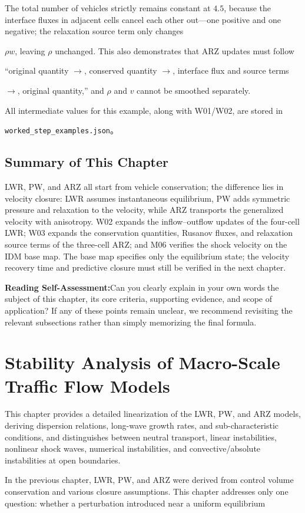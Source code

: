 \documentclass[11pt,a4paper,openany]{book}
\numberwithin{equation}{chapter}
\numberwithin{figure}{chapter}
\numberwithin{table}{chapter}
\newcommand{\sectionwrapup}[1]{%
  \section{Summary of This Chapter}
  \begin{tcolorbox}[summarybox,title=\textbf{Chapter Review}]
  #1
  \par\smallskip
  \textbf{Reading Self-Assessment:}Can you clearly explain in your own words the subject of this chapter, its core criteria, supporting evidence, and scope of application? If any of these points remain unclear, we recommend revisiting the relevant subsections rather than simply memorizing the final formula.
\end{tcolorbox}
  \clearpage
}
\newcommand{\chapterguide}[2]{%
  \begin{tcolorbox}[chapterguide,title=\textbf{Chapter Guide: #1}]
  #2
  \end{tcolorbox}}
\begin{document}
The total number of vehicles strictly remains constant at $4.5$, because the interface fluxes in adjacent cells cancel each other out—one positive and one negative; the relaxation source term only changes

$\rho w$, leaving $\rho$ unchanged. This also demonstrates that ARZ updates must follow

“original quantity $\rightarrow$, conserved quantity $\rightarrow$, interface flux and source terms

$\rightarrow$, original quantity,” and $\rho$ and $v$ cannot be smoothed separately.

All intermediate values for this example, along with W01/W02, are stored in







\texttt{worked\_step\_examples.json}。

\sectionwrapup{LWR, PW, and ARZ all start from vehicle conservation; the difference lies in velocity closure: LWR assumes instantaneous equilibrium, PW adds symmetric pressure and relaxation to the velocity, while ARZ transports the generalized velocity with anisotropy. W02 expands the inflow–outflow updates of the four-cell LWR; W03 expands the conservation quantities, Rusanov fluxes, and relaxation source terms of the three-cell ARZ; and M06 verifies the shock velocity on the IDM base map. The base map specifies only the equilibrium state; the velocity recovery time and predictive closure must still be verified in the next chapter.}

\chapter{Stability Analysis of Macro-Scale Traffic Flow Models}
\label{sec:macro-stability}
\chapterguide{How to Perform Modal Stability Analysis on Continuous Velocity and Density Fields}{This chapter provides a detailed linearization of the LWR, PW, and ARZ models, deriving dispersion relations, long-wave growth rates, and sub-characteristic conditions, and distinguishes between neutral transport, linear instabilities, nonlinear shock waves, numerical instabilities, and convective/absolute instabilities at open boundaries.
}










In the previous chapter, LWR, PW, and ARZ were derived from control volume conservation and various closure assumptions. This chapter addresses only one question: whether a perturbation introduced near a uniform equilibrium
\end{document}
